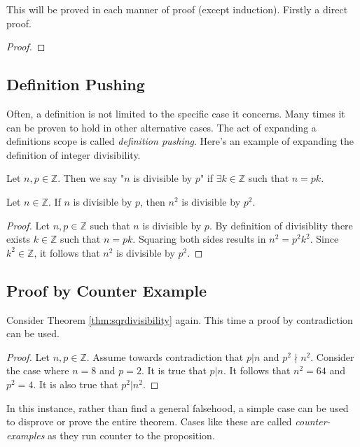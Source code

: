 \documentclass[../notes.tex]{subfiles}
\begin{document}
This will be proved in each manner of proof (except induction). Firstly a direct proof.
\begin{proof}
	
\end{proof}

\subsection{Definition Pushing}

Often, a definition is not limited to the specific case it concerns. Many times it can be proven to hold in other alternative cases. The act of expanding a definitions scope is called \textit{definition pushing}. Here's an example of expanding the definition of integer divisibility.

\begin{definition}[Divisbility]
	Let $n,p \in \mathbb{Z}$. Then we say "$n$ is divisible by $p$" if $\exists k\in\mathbb{Z}$ such that $n = pk$.
\end{definition}

\begin{theorem}
	\label{thm:sqrdivisibility}
	Let $n\in \mathbb{Z}$. If $n$ is divisible by $p$, then $n^2$ is divisible by $p^2$.
\end{theorem}

\begin{proof}
	Let $n,p \in\mathbb{Z}$ such that $n$ is divisible by $p$. By definition of divisiblity there exists $k\in\mathbb{Z}$ such that $n = pk$. Squaring both sides results in $n^2 = p^2 k^2$. Since $k^2 \in\mathbb{Z}$, it follows that $n^2$ is divisible by $p^2$.
\end{proof}

\subsection{Proof by Counter Example}

Consider Theorem \ref{thm:sqrdivisibility} again. This time a proof by contradiction can be used.

\begin{proof}
	Let $n,p\in\mathbb{Z}$. Assume towards contradiction that $p | n$ and $p^2 \nmid n^2$. Consider the case where $n = 8$ and $p = 2$. It is true that $p|n$. It follows that $n^2 = 64$ and $p^2 = 4$. It is also true that $p^2 | n^2$.
\end{proof}

In this instance, rather than find a general falsehood, a simple case can be used to disprove or prove the entire theorem. Cases like these are called \textit{counter-examples} as they run counter to the proposition.
\end{document}
